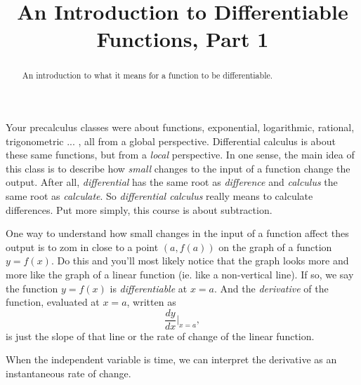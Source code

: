 \documentclass{ximera}
\title{An Introduction to Differentiable Functions, Part 1}
\begin{document}
\begin{abstract}
An introduction to what it means for a function to be differentiable.
\end{abstract}
\maketitle

Your precalculus classes were about functions, exponential, logarithmic, rational, trigonometric ... , all from a global perspective. Differential calculus is about these same functions, but from a \emph{local} perspective. In one sense, the main idea of this class is to describe how \emph{small} changes to the input of a function change the output. After all, \emph{differential} has the same root as \emph{difference} and \emph{calculus} the same root as \emph{calculate}. So \emph{differential calculus} really means to calculate differences. Put more simply, this course is about subtraction.

One way to understand how small changes in the input of a function affect thes output is to zom in close to a point $(a,f(a))$ on the graph of a function $y=f(x)$. Do this and you'll most likely notice that the graph looks more and more like the graph of a linear function (ie. like a non-vertical line). If so, we say the function $y=f(x)$ is \emph{differentiable} at $x=a$. And the \emph{derivative} of the function, evaluated at $x=a$, written as
\[
     \frac{dy}{dx}\Big|_{x=a},
\]
is just the slope of that line or the rate of change of the linear function.

When the independent variable is time, we can interpret the derivative as an instantaneous rate of change.
\end{document}
